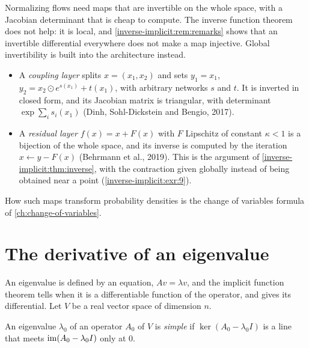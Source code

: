\begin{notechapter}
\begin{mlthread}
Normalizing flows need maps that are invertible on the whole space, with
a Jacobian determinant that is cheap to compute. The inverse function
theorem does not help: it is local, and
\cref{inverse-implicit:rem:remarks} shows that an invertible differential
everywhere does not make a map injective. Global invertibility is built
into the architecture instead.
\begin{itemize}[nosep]
  \item A \emph{coupling layer} splits $x = (x_1, x_2)$ and sets
        $y_1 = x_1$, $y_2 = x_2\odot e^{s(x_1)} + t(x_1)$, with arbitrary
        networks $s$ and $t$. It is inverted in closed form, and its
        Jacobian matrix is triangular, with determinant
        $\exp\sum_is_i(x_1)$ (Dinh, Sohl-Dickstein and Bengio, 2017).
  \item A \emph{residual layer} $f(x) = x + F(x)$ with $F$ Lipschitz of
        constant $\kappa < 1$ is a bijection of the whole space, and its
        inverse is computed by the iteration $x\leftarrow y - F(x)$
        (Behrmann et al., 2019). This is the argument of
        \cref{inverse-implicit:thm:inverse}, with the contraction given
        globally instead of being obtained near a point
        (\cref{inverse-implicit:exr:9}).
\end{itemize}
How such maps transform probability densities is the change of variables
formula of \cref{ch:change-of-variables}.
\end{mlthread}

\section{The derivative of an eigenvalue}
\label{inverse-implicit:sec:eigen}

An eigenvalue is defined by an equation, $Av = \lambda v$, and the
implicit function theorem tells when it is a differentiable function of
the operator, and gives its differential. Let $V$ be a real vector
space of dimension $n$.

\begin{definition}\label{inverse-implicit:def:simple}
An eigenvalue $\lambda_0$ of an operator $A_0$ of $V$ is \emph{simple}
if $\ker(A_0 - \lambda_0I)$ is a line that meets
$\operatorname{im}(A_0 - \lambda_0I)$ only at $0$.
\end{definition}


\end{notechapter}
